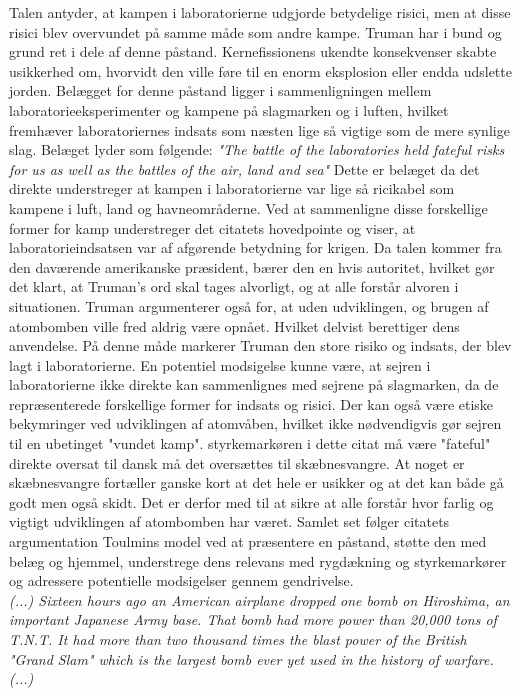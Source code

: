 Talen antyder, at kampen i laboratorierne udgjorde betydelige risici, men at disse risici blev overvundet på samme måde som andre kampe. Truman har i bund og grund ret i dele af denne påstand. Kernefissionens ukendte konsekvenser skabte usikkerhed om, hvorvidt den ville føre til en enorm eksplosion eller endda udslette jorden. Belægget for denne påstand ligger i sammenligningen mellem laboratorieeksperimenter og kampene på slagmarken og i luften, hvilket fremhæver laboratoriernes indsats som næsten lige så vigtige som de mere synlige slag. Belæget lyder som følgende: \emph{"The battle of the laboratories held fateful risks for us as well as the battles of the air, land and sea"} Dette er belæget da det direkte understreger at kampen i laboratorierne var lige så ricikabel som kampene i luft, land og havneområderne. Ved at sammenligne disse forskellige former for kamp understreger det citatets hovedpointe og viser, at laboratorieindsatsen var af afgørende betydning for krigen. Da talen kommer fra den daværende amerikanske præsident, bærer den en hvis autoritet, hvilket gør det klart, at Truman's ord skal tages alvorligt, og at alle forstår alvoren i situationen. Truman argumenterer også for, at uden udviklingen, og brugen af atombomben ville fred aldrig være opnået. Hvilket delvist berettiger dens anvendelse. På denne måde markerer Truman den store risiko og indsats, der blev lagt i laboratorierne. En potentiel modsigelse kunne være, at sejren i laboratorierne ikke direkte kan sammenlignes med sejrene på slagmarken, da de repræsenterede forskellige former for indsats og risici. Der kan også være etiske bekymringer ved udviklingen af atomvåben, hvilket ikke nødvendigvis gør sejren til en ubetinget "vundet kamp". styrkemarkøren i dette citat må være "fateful"  direkte oversat til dansk må det oversættes til skæbnesvangre. At noget er skæbnesvangre fortæller ganske kort at det hele er usikker og at det kan både gå godt men også skidt. Det er derfor med til at sikre at alle forstår hvor farlig og vigtigt udviklingen af atombomben har været. Samlet set følger citatets argumentation Toulmins model ved at præsentere en påstand, støtte den med belæg og hjemmel, understrege dens relevans med rygdækning og styrkemarkører og adressere potentielle modsigelser gennem gendrivelse. \\
\emph{(...) Sixteen hours ago an American airplane dropped one bomb on Hiroshima, an important Japanese Army base. That bomb had more power than 20,000 tons of T.N.T. It had more than two thousand times the blast power of the British "Grand Slam" which is the largest bomb ever yet used in the history of warfare. (...)} \\
